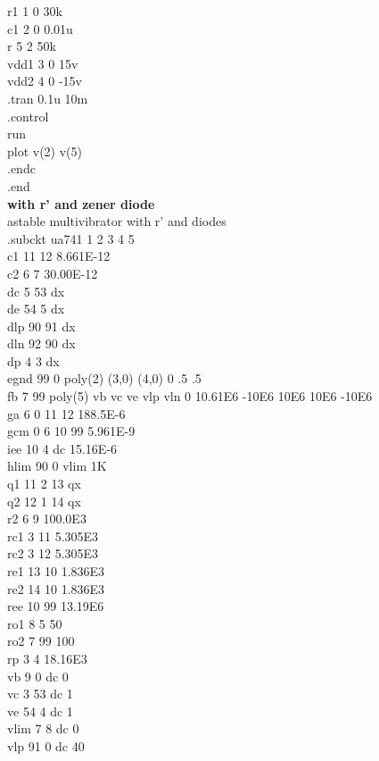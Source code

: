 \documentclass[12pt]{article}
\begin{document}
r1 1 0 30k \\
c1 2 0 0.01u\\
r 5 2 50k\\
vdd1 3 0 15v\\
vdd2 4 0 -15v\\
.tran 0.1u 10m\\
.control\\
run\\
plot v(2) v(5)\\
.endc\\
.end\\
\newpage
\textbf{with r' and zener diode\\}
astable multivibrator with r' and diodes\\
.subckt ua741    1  2  3  4  5\\
c1   11 12 8.661E-12\\
c2    6  7 30.00E-12\\
dc    5 53 dx\\
de   54  5 dx\\
dlp  90 91 dx\\
dln  92 90 dx\\
dp    4  3 dx\\
egnd 99  0 poly(2) (3,0) (4,0) 0 .5 .5\\
fb    7 99 poly(5) vb vc ve vlp vln 0 10.61E6 -10E6 10E6 10E6 -10E6\\
ga    6  0 11 12 188.5E-6\\
gcm   0  6 10 99 5.961E-9\\
iee  10  4 dc 15.16E-6\\
hlim 90  0 vlim 1K\\
q1   11  2 13 qx\\
q2   12  1 14 qx\\
r2    6  9 100.0E3\\
rc1   3 11 5.305E3\\
rc2   3 12 5.305E3\\
re1  13 10 1.836E3\\
re2  14 10 1.836E3\\
ree  10 99 13.19E6\\
ro1   8  5 50\\
ro2   7 99 100\\
rp    3  4 18.16E3\\
vb    9  0 dc 0\\
vc    3 53 dc 1\\
ve   54  4 dc 1\\
vlim  7  8 dc 0\\
vlp  91  0 dc 40\\
\end{document}
